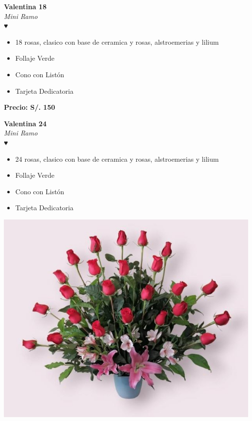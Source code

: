 \documentclass{article}
\begin{document}
\hspace{1cm}
\begin{minipage}{0.6\textwidth}
    \textcolor{cpred}{\textbf{\huge Valentina 18 }}\\
    {\textit{Mini Ramo}} \\
    \textcolor{cpred}{\Huge ♥} \\
    \vspace{0.5cm}
    \begin{itemize}
        \item 18 rosas, clasico con base de ceramica y rosas, alstroemerias y lilium
        \item Follaje Verde
        \item Cono con Listón
        \item Tarjeta Dedicatoria
    \end{itemize}
\end{minipage}
\vspace{0.3cm}
\begin{center}
   \textbf{\Large Precio: \textcolor{cpred}{S/. 150 }}
\end{center}
\vspace{1cm}
\noindent
\begin{minipage}{0.6\textwidth}
    \textcolor{cpred}{\textbf{\huge Valentina 24 }}\\
    {\textit{Mini Ramo}} \\
    \textcolor{cpred}{\Huge ♥} \\
    \vspace{0.5cm}
    \begin{itemize}
        \item 24 rosas, clasico con base de ceramica y rosas, alstroemerias y lilium
        \item Follaje Verde
        \item Cono con Listón
        \item Tarjeta Dedicatoria
    \end{itemize}
\end{minipage}
\hspace{1cm}
\begin{minipage}{0.35\textwidth}
    \includegraphics[width=1.0\textwidth]{imagenes_extraidas/image_10_5}
\end{minipage}
\end{document}
